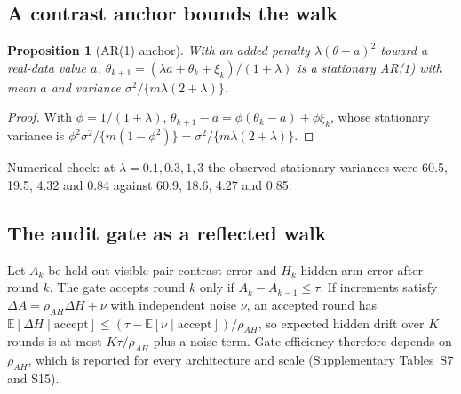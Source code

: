 \documentclass[11pt,a4paper]{article}
\newcommand{\Ex}{\mathbb E}
\newtheorem{proposition}{Proposition}[section]
\begin{document}
\subsection{A contrast anchor bounds the walk}
\begin{proposition}[AR(1) anchor]
With an added penalty $\lambda(\theta-a)^2$ toward a real-data value $a$, $\theta_{k+1}=(\lambda a+\theta_k+\xi_k)/(1+\lambda)$ is a stationary AR(1) with mean $a$ and variance $\sigma^2/\{m\lambda(2+\lambda)\}$.
\end{proposition}
\begin{proof}
With $\phi=1/(1+\lambda)$, $\theta_{k+1}-a=\phi(\theta_k-a)+\phi\xi_k$, whose stationary variance is $\phi^2\sigma^2/\{m(1-\phi^2)\}=\sigma^2/\{m\lambda(2+\lambda)\}$.
\end{proof}
Numerical check: at $\lambda=0.1,0.3,1,3$ the observed stationary variances were 60.5, 19.5, 4.32 and 0.84 against 60.9, 18.6, 4.27 and 0.85.

\subsection{The audit gate as a reflected walk}
Let $A_k$ be held-out visible-pair contrast error and $H_k$ hidden-arm error after round $k$. The gate accepts round $k$ only if $A_k-A_{k-1}\le\tau$. If increments satisfy $\Delta A=\rho_{AH}\Delta H+\nu$ with independent noise $\nu$, an accepted round has $\Ex[\Delta H\mid\text{accept}]\le(\tau-\Ex[\nu\mid\text{accept}])/\rho_{AH}$, so expected hidden drift over $K$ rounds is at most $K\tau/\rho_{AH}$ plus a noise term. Gate efficiency therefore depends on $\rho_{AH}$, which is reported for every architecture and scale (Supplementary Tables~S7 and S15).
\end{document}
